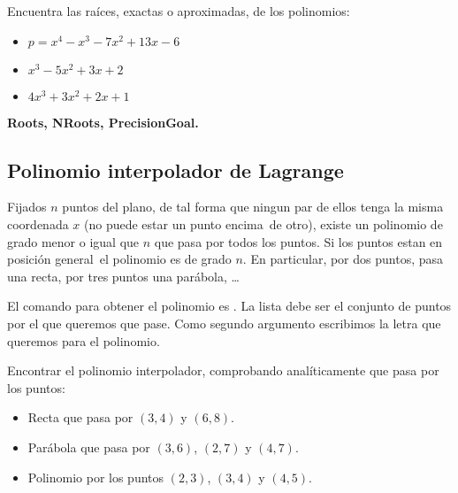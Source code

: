 \documentclass[a4paper,10pt, draft]{article}
\newcommand{\com}[1]{\textbf{\color{blue}{#1}}}
\newenvironment{ejer}{\begin{tcolorbox}[center title, title=Ejercicios,
fonttitle=\sffamily\bfseries,colback=blue!5,colframe=orange]}{\end{tcolorbox}}
\newenvironment{funciones}{\begin{tcolorbox}[center title, title=Nuevas funciones, fonttitle=\sffamily\bfseries, colback=green!5!white,colframe=red!75!black]}{\end{tcolorbox}\bigskip}
\begin{document}
\begin{ejer}

Encuentra las raíces, exactas o aproximadas, de los polinomios:

\begin{itemize}

\item  $p= x^4-x^3-7x^2+13x-6$


\item  $x^3-5x^2+3x+2$


\item $4x^3 +3x^2+2x+1$

\end{itemize}

\end{ejer}  

\begin{funciones}

\textbf{Roots, NRoots, PrecisionGoal.}


\end{funciones}

\newpage

\subsection{Polinomio interpolador de Lagrange}

Fijados $n$ puntos del plano, de tal forma que ningun par de ellos tenga la misma coordenada $x$ (no puede estar un punto \guillemotleft encima\guillemotright\ de otro), existe un polinomio de grado menor o igual que $n$ que pasa por todos los puntos. Si los puntos estan en \guillemotleft posi\-ción general\guillemotright\ el polinomio es de grado $n$. En particular, por dos puntos, pasa una recta, por tres puntos una parábola, \dots

El comando para obtener el polinomio es \com{InterpolatingPolynomial[lista,x]}. La lista debe ser el conjunto de puntos por el que queremos que pase. Como segundo argumento escribimos la letra que queremos para el polinomio.

\begin{ejer}

Encontrar el polinomio interpolador, comprobando  analí\-ticamente que pasa por los puntos:


\begin{itemize}

\item Recta que pasa por $(3,4)$ y $(6,8)$.

\item Parábola que pasa por $(3,6)$, $(2,7)$ y $(4,7)$.

\item Polinomio por los puntos $(2,3)$, $(3,4)$ y $(4,5)$.

\end{itemize}


\end{ejer} 
\end{document}
